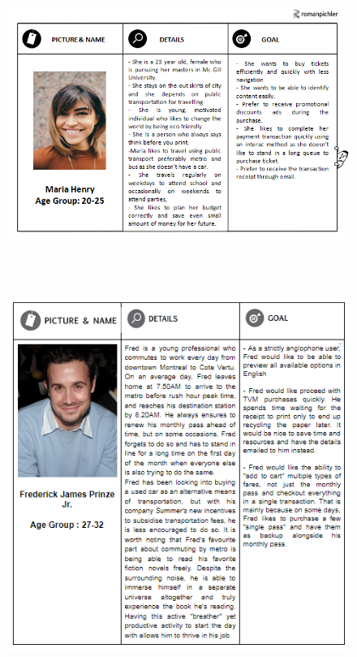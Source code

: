 \documentclass[12pt]{report}
\begin{document}
\begin{figure}[h!]
\begin{center}
  \includegraphics[width=12.5cm, height=8.8cm]{Images/Persona_Surya.png}
  \end{center}
\end{figure}

\begin{figure}[h!]
\begin{center}
  \includegraphics[width=11.5cm, height=13cm]{Images/Persona_Ghalia.png}
  \end{center}
\end{figure}
\end{document}
